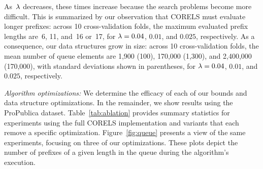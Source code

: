 As~${\lambda}$ decreases, these times increase because the search problems become more difficult.
%
This is summarized by our observation that CORELS must evaluate longer prefixes:
across 10 cross-validation folds, the maximum evaluated prefix lengths are~6,
11, and~16 or~17, for ${{\lambda} = 0.04}$, $0.01$, and $0.025$, respectively.
%
As a consequence, our data structures grow in size: \eg
across 10 cross-validation folds, the mean number of queue elements are
1,900 (100), 170,000 (1,300), and 2,400,000 (170,000),
with standard deviations shown in parentheses,
for ${{\lambda} = 0.04}$, $0.01$, and $0.025$, respectively.


\textit{Algorithm optimizations:}
We determine the efficacy of each of our bounds and data structure optimizations.
%
In the remainder, we show results using the ProPublica dataset.
%
Table~\ref{tab:ablation} provides summary statistics for experiments using
the full CORELS implementation and variants that each remove a specific optimization.
%
Figure~\ref{fig:queue} presents a view of the same experiments, focusing
on three of our optimizations. These plots depict the number of
prefixes of a given length in the queue during the algorithm's execution.

\begin{table}[t!]
\centering
{}
\vspace{4mm}
\caption{Per-component performance improvement.
%
The columns report total execution time,
time to optimum, number of queue insertions,
maximum queue size, and maximum evaluated prefix length.
%
The first row shows CORELS; subsequent rows show variants
that each remove a specific implementation optimization or bound.
%
We terminated each experiment in the last row after consuming 390-410GB RAM.
%
In all but the final row and column, we report means
(and standard deviations) over 10 cross-validation folds;
in the final row, we report the minimum values across folds.
}
\label{tab:ablation}
\end{table}

